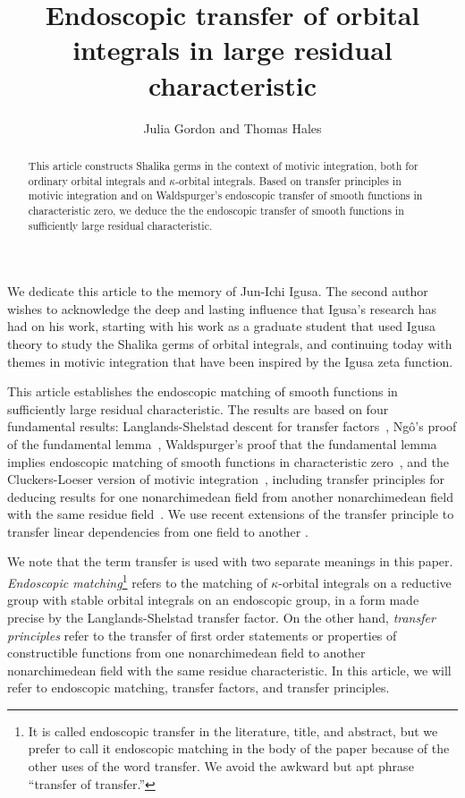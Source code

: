 \documentclass[12pt]{amsart}
\title{Endoscopic transfer of orbital integrals in large residual characteristic}
\author{Julia Gordon and Thomas Hales}
\theoremstyle{plain}
\theoremstyle{definition}
\begin{document}
\begin{abstract} This article constructs Shalika germs in the context
  of motivic integration, both for ordinary orbital integrals and
  $\kappa$-orbital integrals.  Based on transfer principles in motivic
  integration and on Waldspurger's endoscopic transfer of smooth
  functions in characteristic zero, we deduce the the endoscopic
  transfer of smooth functions in sufficiently large residual
  characteristic.
\end{abstract}



\maketitle
\linenumbers


We dedicate this article to the memory of Jun-Ichi Igusa.  The second
author wishes to acknowledge the deep and lasting influence that
Igusa's research has had on his work, starting with his work as a
graduate student that used Igusa theory to study the Shalika germs of
orbital integrals, and continuing today with themes in motivic
integration that have been inspired by the Igusa zeta function.

\bigskip

This article establishes the endoscopic matching of smooth functions
in sufficiently large residual characteristic.  The results are based
on four fundamental results: Langlands-Shelstad descent for transfer
factors~\cite{LSxf}, Ng\^o's proof of the fundamental
lemma~\cite{ngo2010lemme}, Waldspurger's proof that the fundamental lemma
implies endoscopic matching of smooth functions in characteristic
zero~\cite{waldspurger1997lemme}, and the Cluckers-Loeser version of motivic
integration~\cite{CL}, including transfer principles for deducing
results for one nonarchimedean field from another nonarchimedean field
with the same residue field~\cite{CLe}.  We use recent extensions of
the transfer principle to transfer linear dependencies from one field
to another \cite{CGH2}.

We note that the term transfer is used with two separate meanings
in this paper.  {\it Endoscopic matching}\footnote{It is called
  endoscopic transfer in the literature, title, and abstract, but we
  prefer to call it endoscopic matching in the body of the paper
  because of the other uses of the word transfer. We avoid the awkward
  but apt phrase ``transfer of transfer.''}
refers to the matching of $\kappa$-orbital integrals on a reductive
group with stable orbital integrals on an endoscopic group, in a form
made precise by the Langlands-Shelstad transfer factor.  On the other
hand, {\it transfer principles} refer to the transfer of first order
statements or properties of constructible functions from one
nonarchimedean field to another nonarchimedean field with the same
residue characteristic.  In this article, we will refer to endoscopic
matching,
transfer factors, and transfer principles.
\end{document}
